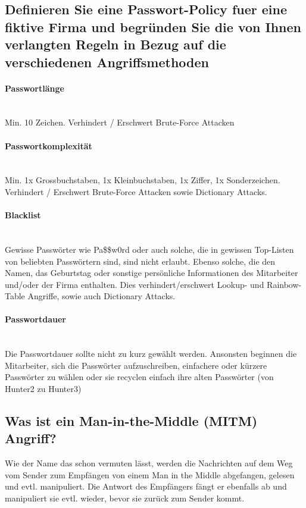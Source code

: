 \documentclass[a4paper, 11pt, nofootinbib]{article}
\begin{document}
\subsection{Definieren Sie eine Passwort-Policy fuer eine fiktive Firma und begründen Sie die von Ihnen verlangten Regeln in Bezug auf die verschiedenen Angriffsmethoden}

\paragraph{Passwortlänge}\mbox{}\\
Min. 10 Zeichen. Verhindert / Erschwert Brute-Force Attacken

\paragraph{Passwortkomplexität}\mbox{}\\
Min. 1x Grossbuchstaben, 1x Kleinbuchstaben, 1x Ziffer, 1x Sonderzeichen. Verhindert / Erschwert Brute-Force Attacken sowie Dictionary Attacks.

\paragraph{Blacklist}\mbox{}\\
Gewisse Passwörter wie Pa\$\$w0rd oder auch solche, die in gewissen Top-Listen von beliebten Passwörtern sind, sind nicht erlaubt. Ebenso solche, die den Namen, das Geburtstag oder sonstige persönliche Informationen des Mitarbeiter und/oder der Firma enthalten. Dies verhindert/erschwert Lookup- und Rainbow-Table Angriffe, sowie auch Dictionary Attacks.

\paragraph{Passwortdauer}\mbox{}\\
Die Passwortdauer sollte nicht zu kurz gewählt werden. Ansonsten beginnen die Mitarbeiter, sich die Passwörter aufzuschreiben, einfachere oder kürzere Passwörter zu wählen oder sie recyclen einfach ihre alten Passwörter (von Hunter2 zu Hunter3)

\newpage

\subsection{Was ist ein Man-in-the-Middle (MITM) Angriff?}
Wie der Name das schon vermuten lässt, werden die Nachrichten auf dem Weg vom Sender zum Empfängen von einem Man in the Middle abgefangen, gelesen und evtl. manipuliert. Die Antwort des Empfängers fängt er ebenfalls ab und manipuliert sie evtl. wieder, bevor sie zurück zum Sender kommt.
\end{document}
